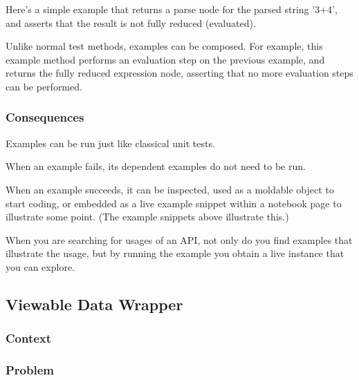 \documentclass[sigconf]{acmart}
\begin{document}
Here's a simple example that returns a parse node for the parsed string '3+4', and asserts that the result is not fully reduced (evaluated).

    
Unlike normal test methods, examples can be composed. For example, this example method performs an evaluation step on the previous example, and returns the fully reduced expression node, asserting that no more evaluation steps can be performed.

    

\subsubsection*{Consequences}

Examples can be run just like classical unit tests.

When an example fails, its dependent examples do not need to be run.

When an example succeeds, it can be inspected, used as a moldable object to start coding, or embedded as a live example snippet within a notebook page to illustrate some point. (The example snippets above illustrate this.)

When you are searching for usages of an API, not only do you find examples that illustrate the usage, but by running the example you obtain a live instance that you can explore.

\subsection*{Viewable Data Wrapper}\label{pat:viewableDataWrapper}
\subsubsection*{Context}
\subsubsection*{Problem}
\end{document}
